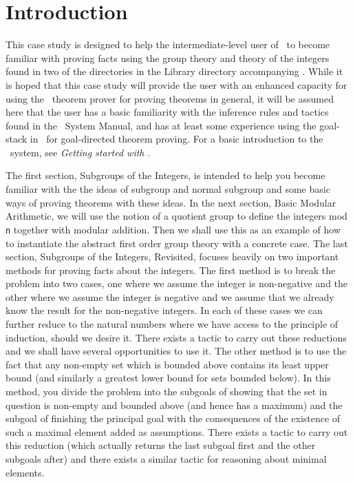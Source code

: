 \section{Introduction}

This case study is designed to help the intermediate-level user of
\HOL\ to become familiar with proving facts using the group theory and
theory of the integers found in two of the directories in the Library
directory accompanying \HOL.  While it is hoped that this case study will
provide the user with an enhanced capacity for using the \HOL\ theorem
prover for proving theorems in general, it will be assumed here that
the user has a basic familiarity with the inference rules and tactics
found in the \HOL\ System Manual, and has at least some experience using
the goal-stack in \HOL\ for goal-directed theorem proving.  For a basic
introduction to the \HOL\ system, see {\sl Getting started with \HOL}.

The first section, Subgroups of the Integers, is intended to help you
become familiar with the the ideas of subgroup and normal subgroup and
some basic ways of proving theorems with these ideas.  In the next
section, Basic Modular Arithmetic, we will use the notion of a quotient
group to define the integers mod {\small\tt n} together with modular 
addition.  Then we shall use this as an example of how to instantiate
the abstract first order group theory with a concrete case.  The last
section, Subgroups of the Integers, Revisited, focuses heavily on two
important methods for proving facts about the integers.  The first
method is to break the problem into two cases, one where we assume the
integer is non-negative and the other where we assume the integer is
negative and we assume that we already know the result for the
non-negative integers.  In each of these cases we can further reduce
to the natural numbers where we have access to the principle of
induction, should we desire it.  There exists a tactic to carry out
these reductions and we shall have several opportunities to use it.
The other method is to use the fact that any non-empty set which is
bounded above contains its least upper bound (and similarly a greatest
lower bound for sets bounded below).  In this method, you divide the
problem into the subgoals of showing that the set in question is
non-empty and bounded above (and hence has a maximum) and the subgoal
of finishing the principal goal with the consequences of the existence
of such a maximal element added as assumptions.  There exists a tactic
to carry out this reduction (which actually returns the last subgoal
first and the other subgoals after) and there exists a similar tactic
for reasoning about minimal elements.

